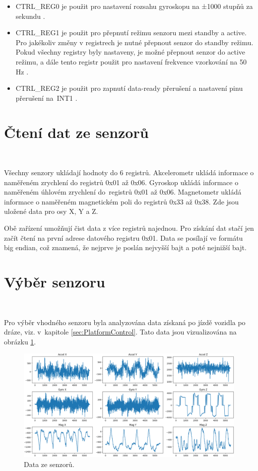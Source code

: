 \begin{itemize}
    \item CTRL\_REG0 je použit pro nastavení rozsahu gyroskopu na ±1000 stupňů za
    sekundu \cite{FXAS21002}.

    \item CTRL\_REG1 je použit pro přepnutí režimu senzoru mezi standby a active.
    Pro jakékoliv změny v registrech je nutné přepnout senzor do standby režimu.
    Pokud všechny registry byly nastaveny, je možné přepnout senzor do active
    režimu, a dále tento registr použit pro nastavení frekvence vzorkování na 50
    Hz \cite{FXAS21002}.

    \item CTRL\_REG2 je použit pro zapnutí data-ready přerušení a nastavení pinu
    přerušení na~INT1 \cite{FXAS21002}.
\end{itemize}

\section{Čtení dat ze senzorů}\

Všechny senzory ukládají hodnoty do 6 registrů. Akcelerometr ukládá informace o
naměřeném zrychlení do registrů 0x01 až 0x06. Gyroskop ukládá informace o naměřeném
úhlovém zrychlení do~registrů 0x01 až 0x06. Magnetometr ukládá informace o naměřeném
magnetickém poli do registrů 0x33 až 0x38. Zde jsou uložené data pro osy X, Y a Z.

Obě zařízení umožňují čist data z více registrů najednou. Pro získání dat stačí jen
začít čtení na první adrese datového registru 0x01. Data se posílají ve formátu big
endian, což znamená, že nejprve je poslán nejvyšší bajt a poté nejnižší bajt.

\section{Výběr senzoru}\

Pro výběr vhodného senzoru byla analyzována data získaná po jízdě vozidla po dráze,
viz. v~kapitole \ref{sec:PlatformControl}. Tato data jsou vizualizována na obrázku
\ref{fig:Sensors}.
\begin{figure}[!h]
    \centering
    \includegraphics[width = 1\linewidth]{Figures/Sensors.png}
    \caption{Data ze senzorů.}
    \label{fig:Sensors}
\end{figure}

